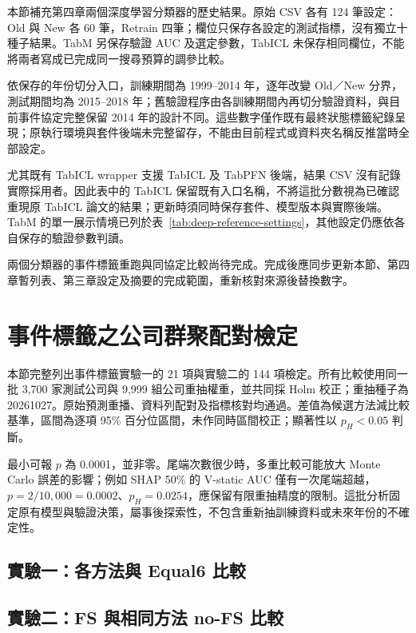 本節補充第四章兩個深度學習分類器的歷史結果。原始 CSV 各有 124 筆設定：Old 與 New 各 60 筆，Retrain 四筆；欄位只保存各設定的測試指標，沒有獨立十種子結果。TabM 另保存驗證 AUC 及選定參數，TabICL 未保存相同欄位，不能將兩者寫成已完成同一搜尋預算的調參比較。

依保存的年份切分入口，訓練期間為 1999--2014 年，逐年改變 Old／New 分界，測試期間均為 2015--2018 年；舊驗證程序由各訓練期間內再切分驗證資料，與目前事件協定完整保留 2014 年的設計不同。這些數字僅作既有最終狀態標籤紀錄呈現；原執行環境與套件後端未完整留存，不能由目前程式或資料夾名稱反推當時全部設定。

尤其既有 TabICL wrapper 支援 TabICL 及 TabPFN 後端，結果 CSV 沒有記錄實際採用者。因此表中的 TabICL 保留既有入口名稱，不將這批分數視為已確認重現原 TabICL 論文的結果；更新時須同時保存套件、模型版本與實際後端。TabM 的單一展示情境已列於表~\ref{tab:deep-reference-settings}，其他設定仍應依各自保存的驗證參數判讀。



兩個分類器的事件標籤重跑與同協定比較尚待完成。完成後應同步更新本節、第四章暫列表、第三章設定及摘要的完成範圍，重新核對來源後替換數字。

\clearpage
\section{事件標籤之公司群聚配對檢定}\label{sec:event-stats-full}

本節完整列出事件標籤實驗一的 21 項與實驗二的 144 項檢定。所有比較使用同一批 3,700 家測試公司與 9,999 組公司重抽權重，並共同採 Holm 校正；重抽種子為 20261027。原始預測重播、資料列配對及指標核對均通過。差值為候選方法減比較基準，區間為逐項 95\% 百分位區間，未作同時區間校正；顯著性以 \(p_H<0.05\) 判斷。

最小可報 \(p\) 為 0.0001，並非零。尾端次數很少時，多重比較可能放大 Monte Carlo 誤差的影響；例如 SHAP 50\% 的 V-static AUC 僅有一次尾端超越，\(p=2/10{,}000=0.0002\)、\(p_H=0.0254\)，應保留有限重抽精度的限制。這批分析固定原有模型與驗證決策，屬事後探索性，不包含重新抽訓練資料或未來年份的不確定性。

\subsection*{實驗一：各方法與 Equal6 比較}


\subsection*{實驗二：FS 與相同方法 no-FS 比較}





